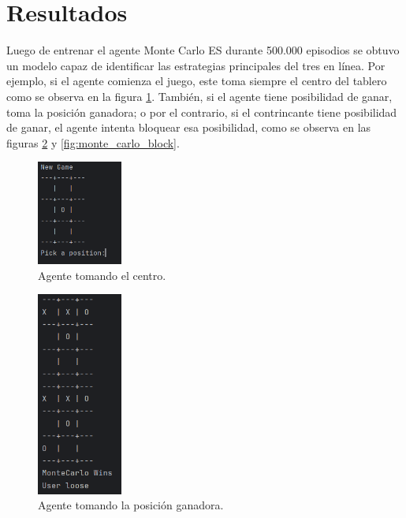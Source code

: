 \section{Resultados}

Luego de entrenar el agente Monte Carlo ES durante 500.000 episodios se obtuvo un modelo capaz de identificar las estrategias principales del tres en línea. Por ejemplo, si el agente comienza el juego, este toma siempre el centro del tablero como se observa en la figura \ref{fig:monte_carlo_center}. También, si el agente tiene posibilidad de ganar, toma la posición ganadora; o por el contrario, si el contrincante tiene posibilidad de ganar, el agente intenta bloquear esa posibilidad, como se observa en las figuras \ref{fig:monte_carlo_win} y \ref{fig:monte_carlo_block}.

\begin{figure}[htbp]
	\centering
	\includegraphics[width=0.25\textwidth]{./Figures/monte_carlo_center.png}
	\caption{Agente tomando el centro.}
	\label{fig:monte_carlo_center}
\end{figure}

\begin{figure}[htbp]
	\centering
	\includegraphics[width=0.25\textwidth]{./Figures/monte_carlo_win.png}
	\caption{Agente tomando la posición ganadora.}
	\label{fig:monte_carlo_win}
\end{figure}

